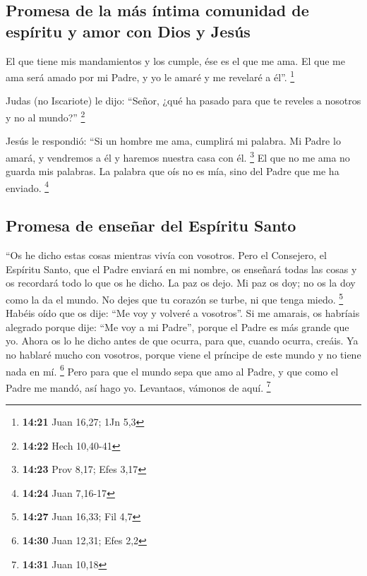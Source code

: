 \begin{paracol}{2}
\hypertarget{promesa-de-la-muxe1s-uxedntima-comunidad-de-espuxedritu-y-amor-con-dios-y-jesuxfas}{%
\subsection{Promesa de la más íntima comunidad de espíritu y amor con
Dios y
Jesús}\label{promesa-de-la-muxe1s-uxedntima-comunidad-de-espuxedritu-y-amor-con-dios-y-jesuxfas}}

 El que tiene mis mandamientos y los cumple, ése es el
que me ama. El que me ama será amado por mi Padre, y yo le amaré y me
revelaré a él''. \footnote{\textbf{14:21} Juan 16,27; 1Jn 5,3}

 Judas (no Iscariote) le dijo: ``Señor, ¿qué ha pasado
para que te reveles a nosotros y no al mundo?'' \footnote{\textbf{14:22}
  Hech 10,40-41}

 Jesús le respondió: ``Si un hombre me ama, cumplirá mi
palabra. Mi Padre lo amará, y vendremos a él y haremos nuestra casa con
él. \footnote{\textbf{14:23} Prov 8,17; Efes 3,17}  El
que no me ama no guarda mis palabras. La palabra que oís no es mía, sino
del Padre que me ha enviado. \footnote{\textbf{14:24} Juan 7,16-17}

\hypertarget{promesa-de-enseuxf1ar-del-espuxedritu-santo}{%
\subsection{Promesa de enseñar del Espíritu
Santo}\label{promesa-de-enseuxf1ar-del-espuxedritu-santo}}

 ``Os he dicho estas cosas mientras vivía con vosotros.
 Pero el Consejero, el Espíritu Santo, que el Padre
enviará en mi nombre, os enseñará todas las cosas y os recordará todo lo
que os he dicho.  La paz os dejo. Mi paz os doy; no os la
doy como la da el mundo. No dejes que tu corazón se turbe, ni que tenga
miedo. \footnote{\textbf{14:27} Juan 16,33; Fil 4,7} 
Habéis oído que os dije: ``Me voy y volveré a vosotros''. Si me amarais,
os habríais alegrado porque dije: ``Me voy a mi Padre'', porque el Padre
es más grande que yo.  Ahora os lo he dicho antes de que
ocurra, para que, cuando ocurra, creáis.  Ya no hablaré
mucho con vosotros, porque viene el príncipe de este mundo y no tiene
nada en mí. \footnote{\textbf{14:30} Juan 12,31; Efes 2,2}
 Pero para que el mundo sepa que amo al Padre, y que como
el Padre me mandó, así hago yo. Levantaos, vámonos de aquí. \footnote{\textbf{14:31}
  Juan 10,18}


\end{paracol}

